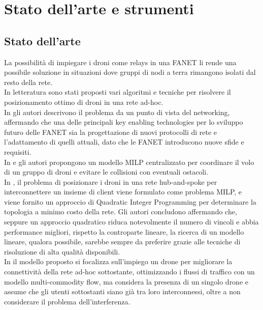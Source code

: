  \chapter{Stato dell'arte e strumenti}

\ifpdf
    \graphicspath{{Chapter4/Figs/Raster/}{Chapter4/Figs/PDF/}{Chapter4/Figs/}}
\else
    \graphicspath{{Chapter4/Figs/Vector/}{Chapter4/Figs/}}
\fi

\section{Stato dell'arte}
La possibilità di impiegare i droni come relays in una FANET li rende una possibile soluzione in situazioni dove gruppi di nodi a terra rimangono isolati dal resto della rete. \\
In letteratura sono stati proposti vari algoritmi e tecniche per risolvere il posizionamento ottimo di droni in una rete ad-hoc. \\
In \cite{Sahingoz2014, 6477822} gli autori descrivono il problema da un punto di vista del networking, affermando che una delle principali key enabling technologies per lo sviluppo futuro delle FANET sia la progettazione di nuovi protocolli di rete e l'adattamento di quelli attuali, dato che le FANET introducono nuove sfide e requisiti. \\
In \cite{1023918} e \cite{Burdakov2010} gli autori propongono un modello MILP centralizzato per coordinare il volo di un gruppo di droni e evitare le collisioni con eventuali ostacoli. \\
In \cite{6564778}, il problema di posizionare i droni in una rete hub-and-spoke per interconnettere un insieme di client viene formulato come problema MILP, e viene fornito un approccio di Quadratic Integer Programming per determinare la topologia a minimo costo della rete.
Gli autori concludono affermando che, seppure un approccio quadratico riduca notevolmente il numero di vincoli e abbia performance migliori, rispetto la controparte lineare, la ricerca di un modello lineare, qualora possibile, sarebbe sempre da preferire grazie alle tecniche di risoluzione di alta qualità disponibili.\\
In \cite{4455114} il modello proposto si focalizza sull'impiego un drone per migliorare la connettività della rete ad-hoc sottostante, ottimizzando i flussi di traffico con un modello multi-commodity flow, ma considera la presenza di un singolo drone e assume che gli utenti sottostanti siano già tra loro interconnessi, oltre a non considerare il problema dell'interferenza. \\
